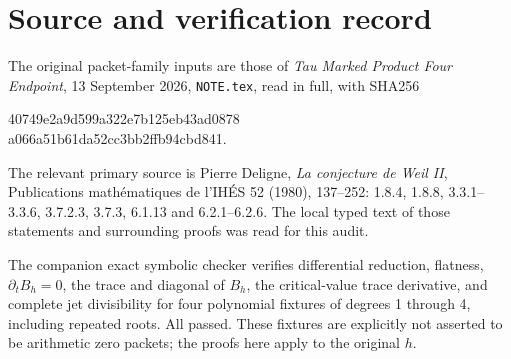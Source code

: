 \section*{Source and verification record}
The original packet-family inputs are those of
\emph{Tau Marked Product Four Endpoint}, 13 September 2026,
\texttt{NOTE.tex}, read in full, with SHA256
\begin{center}\ttfamily\small
40749e2a9d599a322e7b125eb43ad0878\\
a066a51b61da52cc3bb2ffb94cbd841.
\end{center}
The relevant primary source is Pierre Deligne,
\emph{La conjecture de Weil II}, Publications math\'ematiques de
l'IH\'ES 52 (1980), 137--252: 1.8.4, 1.8.8, 3.3.1--3.3.6,
3.7.2.3, 3.7.3, 6.1.13 and 6.2.1--6.2.6.  The local typed text of
those statements and surrounding proofs was read for this audit.

The companion exact symbolic checker verifies differential reduction,
flatness, $\partial_tB_h=0$, the trace and diagonal of $B_h$, the
critical-value trace derivative, and complete jet divisibility for four
polynomial fixtures of degrees 1 through 4, including repeated roots.
All passed.  These fixtures are explicitly not asserted to be
arithmetic zero packets; the proofs here apply to the original $h$.
